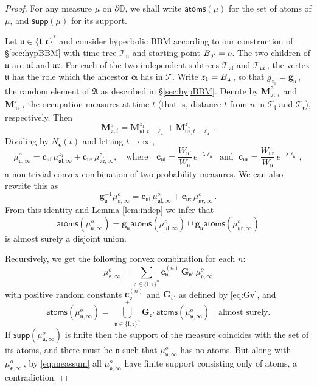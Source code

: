 \documentclass[10pt,a4paper]{amsart}
\newcommand\Aff{\mathfrak A}
\newcommand\BB{\textit{\textbf{B}}}
\newcommand\DD{\mathbb D}
\newcommand\Gb{\mathbf{G}}
\newcommand\Mbf{\mathbf M}
\newcommand\T{\mathcal T}
\newcommand\bal{\boldsymbol{\alpha}}
\newcommand\bep{\boldsymbol{\epsilon}}
\newcommand\cb{\mathbf{c}}
\newcommand\gb{\mathbf{g}}
\newcommand\lt{\mathfrak{l}}
\newcommand\nn{N}
\newcommand\rt{\mathfrak{r}}
\newcommand\ut{\mathfrak{u}}
\newcommand\vt{\mathfrak{v}}
\begin{document}
\begin{proof} For any measure $\mu$ on $\partial \DD$, we shall write 
$\mathsf{atoms}(\mu)$ for the set of atoms of  $\mu$, and $\mathsf{supp}(\mu)$
for its support.

Let $\ut \in  \{\lt,\rt\}^*$ and consider hyperbolic BBM according to our construction
of \S \ref{sec:hypBBM} with time tree $\T_{\ut}$ and starting point $\BB_{\ut'} = o$. 
The two children of $\ut$ are $\ut\lt$ and $\ut\rt$. For each of the 
two independent subtrees $\T_{\ut\lt}$ and $\T_{\ut\rt}\,$, the vertex
$\ut$ has the role which the ancestor $\bal$ has in $\T$. Write 
$z_1 = \BB_{\ut}\,$, so that $g_{z_1} = \gb_{\ut}\,$, the random element
of $\Aff$ as described in \S \ref{sec:hypBBM}.
Denote by $\Mbf_{\ut\lt,t}^{z_1}$ and $\Mbf_{\ut\rt,t}^{z_1}$ the occupation measures
at time $t$ (that is, distance $t$ from $u$ in $\T_{\lt}$ and $\T_{\rt}$),
respectively. 
Then
$$
\Mbf_{\ut,t}^o = \Mbf_{\ut\lt,t-\ell_{\ut}}^{z_1} + \Mbf_{\ut\rt,t-\ell_{\ut}}^{z_1}\,.
$$
Dividing by $\nn_{\bep}(t)$ and letting $t \to \infty\,$,
$$
\mu_{\ut,\infty}^o 
= \cb_{\ut\lt} \,\mu_{\ut\lt,\infty}^{z_1}
+ \cb_{\ut\rt}\,\mu_{\ut\rt,\infty}^{z_1},
\quad \text{where}\quad \cb_{\ut\lt} = \frac{W_{\ut\lt}}{W_{\ut}} \, e^{-\lambda\ell_{\ut}}
\;\text{ and }\; \cb_{\ut\rt} = \frac{W_{\ut\rt}}{W_{\ut}} \, e^{-\lambda\ell_{\ut}}\,,
$$
a non-trivial convex combination of two probability measures. 
We can also rewrite this as
$$
\gb_{\ut}^{-1}\mu_{\ut,\infty}^o 
= \cb_{\ut\lt} \,\mu_{\ut\lt,\infty}^{o}
+ \cb_{\ut\rt}\,\mu_{\ut\rt,\infty}^{o}\,.
$$
From this identity and Lemma \ref{lem:indep} we infer that
$$
\mathsf{atoms}(\mu_{\ut,\infty}^o) 
= \gb_{\ut}\mathsf{atoms}(\mu_{\ut\lt,\infty}^o)  \stackrel{{\,}_{_{_{_+}}}}{\cup} 
\gb_{\ut}\mathsf{atoms}(\mu_{\ut\rt,\infty}^o)
$$
is almost surely a disjoint union. 

Recursively, we get the following convex combination for each $n$:
\begin{equation}\label{eq:meassum}
\mu_{\bep,\infty}^o = 
\sum_{\vt \in \{\lt,\rt\}^n} \cb^{(n)}_{\vt}\, \Gb_{\vt'}\, \mu_{\vt,\infty}^o
\end{equation}
with positive random constants $\cb^{(n)}_{\vt}$ and $\Gb_{v'}$ as defined by \eqref{eq:Gv}, and 
$$
\mathsf{atoms}(\mu_{\ut,\infty}^o) = %
\ {\bigcup}_{\vt \in \{\lt,\rt\}^n}^{\!\!\!\!\!\!\!+}
\Gb_{\vt'}\, \mathsf{atoms}(\mu_{\vt,\infty}^o) \quad \text{almost surely.}
$$
If $\mathsf{supp}(\mu_{\ut,\infty}^o)$ is finite then the support of the measure coincides with
the set of its atoms, and there must be $\vt$ such that $\mu_{\vt,\infty}^o$ has no atoms.
But along with $\mu_{\bep,\infty}^o\,$, by \eqref{eq:meassum} all $\mu_{\vt,\infty}^o$
have finite support consisting only of atoms, a contradiction.
\end{proof}
\end{document}
